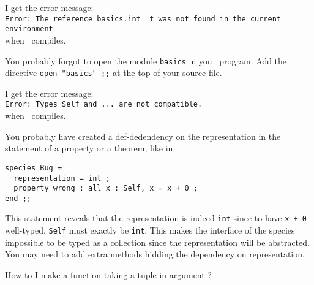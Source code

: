 \documentclass[10pt,a4paper]{article}
\begin{document}
\begin{adjustwidth}{2em}{0em}
I get the error message:\\
  \verb+Error: The reference basics.int__t was not found in the current+\\
  \verb+environment+\\
when \coq\ compiles.
\end{adjustwidth}

\medskip
{}
\begin{adjustwidth}{2em}{0em}
You probably forgot to open the module {\tt basics} in you \focal\ program.
Add the directive \lstinline{open "basics" ;;} at the top of your source
 file.
 \end{adjustwidth}



\bigskip
{}
\begin{adjustwidth}{2em}{0em}
I get the error message:\\
  \verb+Error: Types Self and ... are not compatible.+\\
when \focalizec\ compiles.
\end{adjustwidth}

\medskip
{}
\begin{adjustwidth}{2em}{0em}
You probably have created a def-dedendency on the
representation in the statement of a property or a theorem, like in:
{\small
\begin{lstlisting}
species Bug =
  representation = int ;
  property wrong : all x : Self, x = x + 0 ;
end ;;
\end{lstlisting}}


This statement reveals that the representation is indeed {\tt int} since to
have \lstinline"x + 0" well-typed, {\tt Self} must exactly be {\tt int}. This
makes the interface of the species impossible to be typed as a collection
since the representation will be abstracted. You may need to add extra methods
hidding the dependency on representation.
\end{adjustwidth}



\bigskip
{}
\begin{adjustwidth}{2em}{0em}
How to I make a function taking a tuple in argument ?
\end{adjustwidth}
\end{document}
